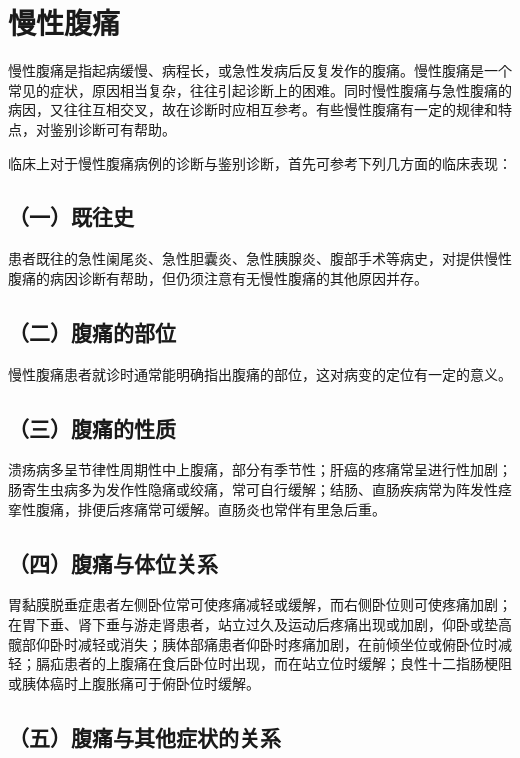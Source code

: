 \chapter{慢性腹痛}

慢性腹痛是指起病缓慢、病程长，或急性发病后反复发作的腹痛。慢性腹痛是一个常见的症状，原因相当复杂，往往引起诊断上的困难。同时慢性腹痛与急性腹痛的病因，又往往互相交叉，故在诊断时应相互参考。有些慢性腹痛有一定的规律和特点，对鉴别诊断可有帮助。

临床上对于慢性腹痛病例的诊断与鉴别诊断，首先可参考下列几方面的临床表现：

\section{（一）既往史}

患者既往的急性阑尾炎、急性胆囊炎、急性胰腺炎、腹部手术等病史，对提供慢性腹痛的病因诊断有帮助，但仍须注意有无慢性腹痛的其他原因并存。

\section{（二）腹痛的部位}

慢性腹痛患者就诊时通常能明确指出腹痛的部位，这对病变的定位有一定的意义。

\section{（三）腹痛的性质}

溃疡病多呈节律性周期性中上腹痛，部分有季节性；肝癌的疼痛常呈进行性加剧；肠寄生虫病多为发作性隐痛或绞痛，常可自行缓解；结肠、直肠疾病常为阵发性痉挛性腹痛，排便后疼痛常可缓解。直肠炎也常伴有里急后重。

\section{（四）腹痛与体位关系}

胃黏膜脱垂症患者左侧卧位常可使疼痛减轻或缓解，而右侧卧位则可使疼痛加剧；在胃下垂、肾下垂与游走肾患者，站立过久及运动后疼痛出现或加剧，仰卧或垫高髋部仰卧时减轻或消失；胰体部痛患者仰卧时疼痛加剧，在前倾坐位或俯卧位时减轻；膈疝患者的上腹痛在食后卧位时出现，而在站立位时缓解；良性十二指肠梗阻或胰体癌时上腹胀痛可于俯卧位时缓解。

\section{（五）腹痛与其他症状的关系}

